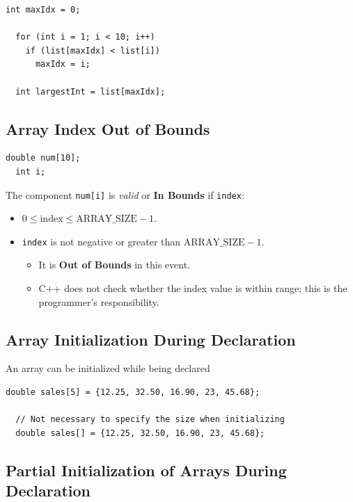 \documentclass{article}
\begin{document}
\begin{lstlisting}[caption={Find Largest Element in 1D Array}]
  int maxIdx = 0;

  for (int i = 1; i < 10; i++)
    if (list[maxIdx] < list[i])
      maxIdx = i;

  int largestInt = list[maxIdx];
\end{lstlisting}

\subsection{Array Index Out of Bounds}

\begin{lstlisting}[caption={Array Index Example}]
  double num[10];
  int i;
\end{lstlisting}

The component \texttt{num[i]} is \textit{valid} or \textbf{In Bounds} if
\texttt{index}:
\begin{itemize}
  \item $0 \leq \text{index} \leq \text{ARRAY\_SIZE} - 1$.
  \item \texttt{index} is not negative or greater than $\text{ARRAY\_SIZE} - 1$.
  \begin{itemize}
    \item It is \textbf{Out of Bounds} in this event.
    \item C++ does not check whether the index value is within range; this is
      the programmer's responsibility.
  \end{itemize}
\end{itemize}

\subsection{Array Initialization During Declaration}
An array can be initialized while being declared

\begin{lstlisting}[caption={Array Initialization Example}]
  double sales[5] = {12.25, 32.50, 16.90, 23, 45.68};

  // Not necessary to specify the size when initializing
  double sales[] = {12.25, 32.50, 16.90, 23, 45.68};
\end{lstlisting}

\subsection{Partial Initialization of Arrays During Declaration}
\end{document}

